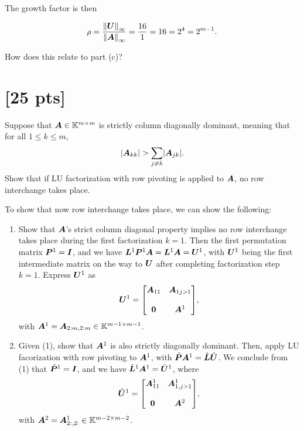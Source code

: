 \documentclass[twoside,10pt]{article}
\begin{document}
The growth factor is then

$$\rho = \dfrac{\left\| \mtx{U} \right\|_{\infty}}{\left\|\mtx{A}\right\|_{\infty}} = \dfrac{16}{1} = 16 = 2^4 = 2^{m - 1}.$$

How does this relate to part (c)? 

\section{[25 pts]}
Suppose that $\bm{A} \in \mathbb{K}^{m \times m}$ is strictly column diagonally dominant, meaning that for all $1 \leq k \leq m$, 
\begin{equation}
  \left|\mtx{A}_{kk}\right| > \sum \limits_{j \neq k} \left|\mtx{A}_{jk}\right|.
\end{equation}
Show that if LU factorization with row pivoting is applied to $\bm{A}$, no row interchange takes place.

To show that now row interchange takes place, we can show the following:
\begin{enumerate}
  \item Show that $\bm{A}$'s strict column diagonal property implies no row interchange takes place during the first factorization $k = 1$.
    Then the first permutation matrix $\bm{P}^1 = \bm{I}$, and we have $\bm{L}^1\bm{P}^1\bm{A} = \bm{L}^1\bm{A} = \bm{U}^1$, with $\bm{U}^1$ being the first intermediate matrix on the way to $\bm{U}$ after completing factorization step $k=1$.
    Express $\bm{U}^1$ as
    $$\mtx{U}^1 = \begin{bmatrix}\mtx{A}_{1 1} & \mtx{A}_{1 j>1}\\\hbox{}\\\mtx{0} & \mtx{A}^{1}\end{bmatrix},$$
    with $\bm{A}^1 = \bm{A}_{2:m,2:m} \in \mathbb{K}^{m-1 \times m-1}$.
  \item Given (1), show that $\bm{A}^{1}$ is also strictly diagonally dominant.
    Then, apply LU facorization with row pivoting to $\bm{A}^1$, with $\hat{\bm{P}}\bm{A}^1 = \hat{\bm{L}}\hat{\bm{U}}$.
    We conclude from (1) that $\hat{\bm{P}}^1 = \bm{I}$, and we have $\hat{\bm{L}}^1\bm{A}^1 = \hat{\bm{U}}^1$, where
    $$\hat{\mtx{U}}^1 = \begin{bmatrix}\mtx{A}^1_{1 1} & \mtx{A}^1_{1,j>1}\\\hbox{}\\\mtx{0} & \mtx{A}^{2}\end{bmatrix},$$
    with $\bm{A}^2 = \bm{A}^1_{2:,2:} \in \mathbb{K}^{m-2 \times m-2}$.
\end{enumerate}
\end{document}
